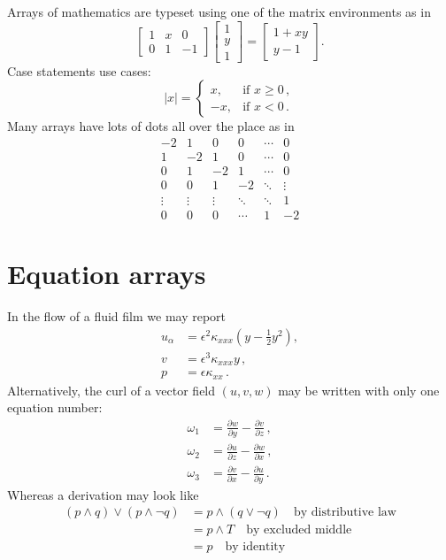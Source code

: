 \documentclass[20pt,a4paper]{extarticle}
\begin{document}
Arrays of mathematics are typeset using one of the matrix environments as 
in
\[
	\begin{bmatrix}
		1 & x & 0 \\
		0 & 1 & -1
	\end{bmatrix}\begin{bmatrix}
		1  \\
		y  \\
		1
	\end{bmatrix}
	=\begin{bmatrix}
		1+xy  \\
		y-1
	\end{bmatrix}.
\]
Case statements use cases:
\[
	|x|=\begin{cases}
		x, & \text{if }x\geq 0\,,  \\
		-x, & \text{if }x< 0\,.
	\end{cases}
\]
Many arrays have lots of dots all over the place as in
\[
	\begin{matrix}
		-2 & 1 & 0 & 0 & \cdots & 0  \\
		1 & -2 & 1 & 0 & \cdots & 0  \\
		0 & 1 & -2 & 1 & \cdots & 0  \\
		0 & 0 & 1 & -2 & \ddots & \vdots \\
		\vdots & \vdots & \vdots & \ddots & \ddots & 1  \\
		0 & 0 & 0 & \cdots & 1 & -2
	\end{matrix}
\]






\section{Equation arrays}

In the flow of a fluid film we may report
\begin{align}
	u_\alpha & =  \epsilon^2 \kappa_{xxx} 
	\left( y-\frac{1}{2}y^2 \right),
	\label{equ}  \\
	v & =  \epsilon^3 \kappa_{xxx} y\,,
	\label{eqv}  \\
	p & =  \epsilon \kappa_{xx}\,.
	\label{eqp}
\end{align}
Alternatively, the curl of a vector field $(u,v,w)$ may be written 
with only one equation number:
\begin{align}
	\omega_1 & = 
	\frac{\partial w}{\partial y}-\frac{\partial v}{\partial z}\,,
	\nonumber  \\
	\omega_2 & =  
	\frac{\partial u}{\partial z}-\frac{\partial w}{\partial x}\,,
	\label{eqcurl}  \\
	\omega_3 & =  
	\frac{\partial v}{\partial x}-\frac{\partial u}{\partial y}\,.
	\nonumber
\end{align}
Whereas a derivation may look like
\begin{align*}
	(p\wedge q)\vee(p\wedge\neg q) & =  p\wedge(q\vee\neg q)
	\quad\text{by distributive law}  \\
	 & =  p\wedge T \quad\text{by excluded middle}  \\
	 & =  p \quad\text{by identity}
\end{align*}
\end{document}

